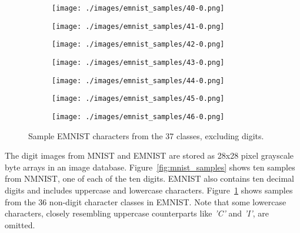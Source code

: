 \begin{figure}[H]
    \par\medskip

    \begin{subfigure}{.10\textwidth}
        \centering
        \texttt{[image: ./images/emnist\_samples/40-0.png]}
    \end{subfigure}%
    \begin{subfigure}{.10\textwidth}
        \centering
        \texttt{[image: ./images/emnist\_samples/41-0.png]}
    \end{subfigure}%
    \begin{subfigure}{.10\textwidth}
        \centering
        \texttt{[image: ./images/emnist\_samples/42-0.png]}
    \end{subfigure}%
    \begin{subfigure}{.10\textwidth}
        \centering
        \texttt{[image: ./images/emnist\_samples/43-0.png]}
    \end{subfigure}%
    \begin{subfigure}{.10\textwidth}
        \centering
        \texttt{[image: ./images/emnist\_samples/44-0.png]}
    \end{subfigure}%
    \begin{subfigure}{.10\textwidth}
        \centering
        \texttt{[image: ./images/emnist\_samples/45-0.png]}
    \end{subfigure}%
    \begin{subfigure}{.10\textwidth}
        \centering
        \texttt{[image: ./images/emnist\_samples/46-0.png]}
    \end{subfigure}%

    \caption{Sample EMNIST characters from the 37 classes, excluding digits.}
    \label{fig:emnist_samples}
\end{figure}

The digit images from MNIST and EMNIST are stored as 28x28 pixel grayscale byte
arrays in an image database. Figure~\ref{fig:mnist_samples} shows ten samples from
NMNIST, one of each of the ten digits. EMNIST also contains ten decimal digits
and includes uppercase and lowercase characters. Figure~\ref{fig:emnist_samples}
shows samples from the 36 non-digit character classes in EMNIST. Note that some
lowercase characters, closely resembling uppercase counterparts like
\textit{'C'} and \textit{'I'}, are omitted.

